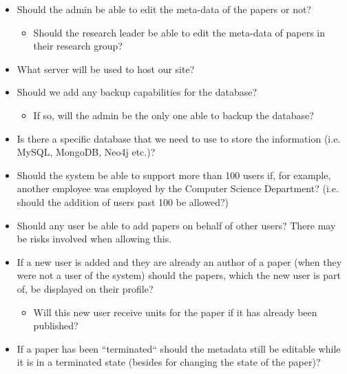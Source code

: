 \documentclass[a4paper,12pt]{article}
\begin{document}
\begin{itemize}	
\item Should the admin be able to edit the meta-data of the papers or not?
	\begin{itemize}
	\item Should the research leader be able to edit the meta-data of papers in their research group?
	\end{itemize}
\item What server will be used to host our site? 
\item Should we add any backup capabilities for the database?
	\begin{itemize}
	\item If so, will the admin be the only one able to backup the database?
	\end{itemize}
\item Is there a specific database that we need to use to store the information (i.e. MySQL, MongoDB, Neo4j etc.)?
\item Should the system be able to support more than 100 users if, for example, another employee was employed by the Computer Science Department? (i.e. should the addition of users past 100 be allowed?)
\item Should any user be able to add papers on behalf of other users? There may be risks involved when allowing this.
\item If a new user is added and they are already an author of a paper (when they were not a user of the system) should the papers, which the new user is part of, be displayed on their profile?
	\begin{itemize}
	\item Will this new user receive units for the paper if it has already been published?
	\end{itemize}
\item If a paper has been ``terminated`` should the metadata still be editable while it is in a terminated state (besides for changing the state of the paper)?
\end{itemize}
\end{document}

